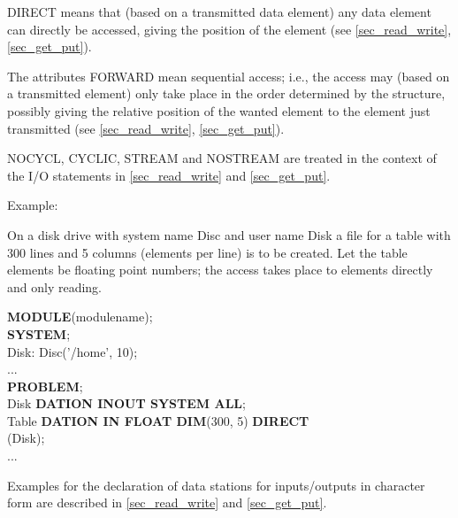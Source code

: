 DIRECT 
means that (based on a transmitted data element) any data element
can directly be accessed, giving the position of the element
(see \ref{sec_read_write}, \ref{sec_get_put}).

The attributes FORWARD 
 mean sequential access; i.e., the
access may (based on a transmitted element) only take place in the order
determined by the structure,
possibly giving the relative position of the wanted
element to the element just transmitted 
(see \ref{sec_read_write}, \ref{sec_get_put}).


NOCYCL, CYCLIC,
 STREAM and 
NOSTREAM are treated in the context of the
I/O statements in 
\ref{sec_read_write} and \ref{sec_get_put}.

Example:

On a disk drive with system name 
Disc
 and user name Disk a file for a
table with 300 lines and 5 columns (elements per line) is to be created.
Let the table elements be floating point numbers; the access takes place
to elements directly and only reading.

{\bf MODULE}(modulename);\\

{\bf SYSTEM};\\
\x Disk: Disc('/home', 10);\\
\x ... \\
\label{Example}
{\bf PROBLEM};\\
 Disk {\bf DATION INOUT SYSTEM ALL};\\
 Table {\bf DATION IN FLOAT DIM}(300, 5) {\bf DIRECT}\\
\x {} (Disk);\\
\x ...

Examples for the declaration of data stations for inputs/outputs in
character form are described in 
\ref{sec_read_write} and \ref{sec_get_put}.

